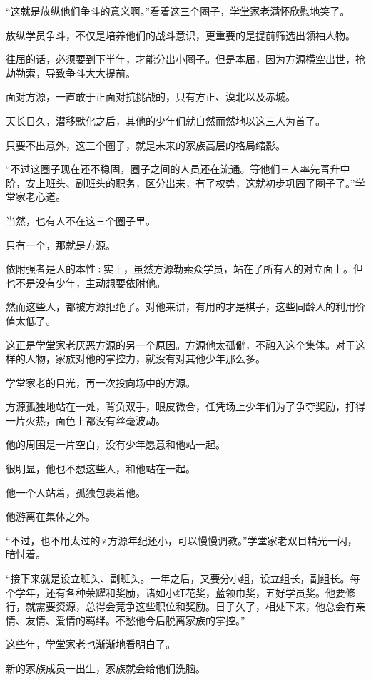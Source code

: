 \begin{this_body}
“这就是放纵他们争斗的意义啊。”看着这三个圈子，学堂家老满怀欣慰地笑了。

放纵学员争斗，不仅是培养他们的战斗意识，更重要的是提前筛选出领袖人物。

往届的话，必须要到下半年，才能分出小圈子。但是本届，因为方源横空出世，抢劫勒索，导致争斗大大提前。

面对方源，一直敢于正面对抗挑战的，只有方正、漠北以及赤城。

天长日久，潜移默化之后，其他的少年们就自然而然地以这三人为首了。

只要不出意外，这三个圈子，就是未来的家族高层的格局缩影。

“不过这圈子现在还不稳固，圈子之间的人员还在流通。等他们三人率先晋升中阶，安上班头、副班头的职务，区分出来，有了权势，这就初步巩固了圈子了。”学堂家老心道。

当然，也有人不在这三个圈子里。

只有一个，那就是方源。

依附强者是人的本性÷实上，虽然方源勒索众学员，站在了所有人的对立面上。但也不是没有少年，主动想要依附他。

然而这些人，都被方源拒绝了。对他来讲，有用的才是棋子，这些同龄人的利用价值太低了。

这正是学堂家老厌恶方源的另一个原因。方源他太孤僻，不融入这个集体。对于这样的人物，家族对他的掌控力，就没有对其他少年那么多。

学堂家老的目光，再一次投向场中的方源。

方源孤独地站在一处，背负双手，眼皮微合，任凭场上少年们为了争夺奖励，打得一片火热，面色上都没有丝毫波动。

他的周围是一片空白，没有少年愿意和他站一起。

很明显，他也不想这些人，和他站在一起。

他一个人站着，孤独包裹着他。

他游离在集体之外。

“不过，也不用太过的♀方源年纪还小，可以慢慢调教。”学堂家老双目精光一闪，暗忖着。

“接下来就是设立班头、副班头。一年之后，又要分小组，设立组长，副组长。每个学年，还有各种荣耀和奖励，诸如小红花奖，蓝领巾奖，五好学员奖。他要修行，就需要资源，总得会竞争这些职位和奖励。日子久了，相处下来，他总会有亲情、友情、爱情的羁绊。不愁他今后脱离家族的掌控。”

这些年，学堂家老也渐渐地看明白了。

新的家族成员一出生，家族就会给他们洗脑。


\end{this_body}
